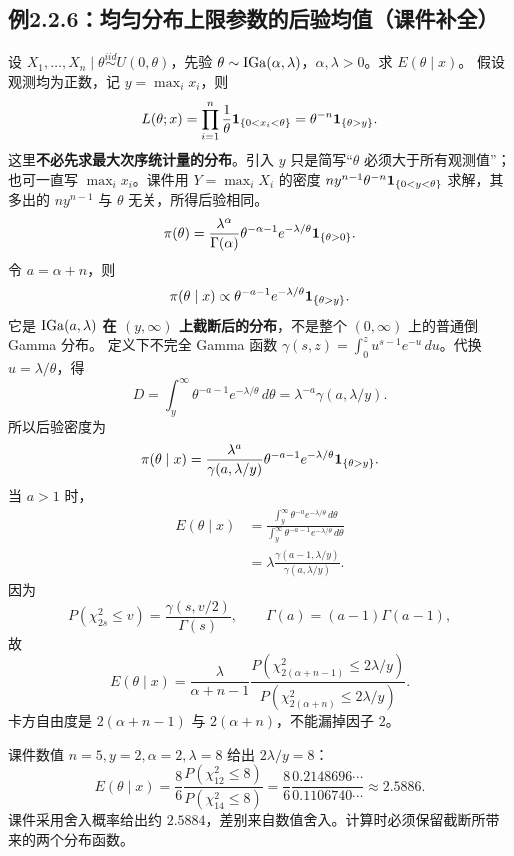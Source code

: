 \subsection{例2.2.6：均匀分布上限参数的后验均值（课件补全）}
设 $X_1,\ldots,X_n\mid\theta\overset{iid}{\sim}U(0,\theta)$，先验 $\theta\sim\operatorname{IGa}(\alpha,\lambda)$，$\alpha,\lambda>0$。求 $E(\theta\mid x)$。
假设观测均为正数，记 $y=\max_i x_i$，则
\[
L(\theta;x)=\prod_{i=1}^n\frac1\theta\mathbf{1}_{\{0<x_i<\theta\}}
=\theta^{-n}\mathbf{1}_{\{\theta>y\}}.
\]
这里\textbf{不必先求最大次序统计量的分布}。引入 $y$ 只是简写“$\theta$ 必须大于所有观测值”；也可一直写 $\max_i x_i$。课件用 $Y=\max_iX_i$ 的密度 $ny^{n-1}\theta^{-n}\mathbf{1}_{\{0<y<\theta\}}$ 求解，其多出的 $ny^{n-1}$ 与 $\theta$ 无关，所得后验相同。
\[
\pi(\theta)=\frac{\lambda^\alpha}{\Gamma(\alpha)}
\theta^{-\alpha-1}e^{-\lambda/\theta}\mathbf{1}_{\{\theta>0\}}.
\]
令 $a=\alpha+n$，则
\[
\pi(\theta\mid x)\propto\theta^{-a-1}e^{-\lambda/\theta}\mathbf{1}_{\{\theta>y\}}.
\]
它是 $\operatorname{IGa}(a,\lambda)$ \textbf{在 $(y,\infty)$ 上截断后的分布}，不是整个 $(0,\infty)$ 上的普通倒 Gamma 分布。
定义下不完全 Gamma 函数 $\gamma(s,z)=\int_0^z u^{s-1}e^{-u}\,du$。代换 $u=\lambda/\theta$，得
\[
D=\int_y^\infty\theta^{-a-1}e^{-\lambda/\theta}\,d\theta
=\lambda^{-a}\gamma(a,\lambda/y).
\]
所以后验密度为
\[
\pi(\theta\mid x)=\frac{\lambda^a}{\gamma(a,\lambda/y)}
\theta^{-a-1}e^{-\lambda/\theta}\mathbf{1}_{\{\theta>y\}}.
\]
当 $a>1$ 时，
\begin{align*}
E(\theta\mid x)
&=\frac{\displaystyle\int_y^\infty\theta^{-a}e^{-\lambda/\theta}\,d\theta}
{\displaystyle\int_y^\infty\theta^{-a-1}e^{-\lambda/\theta}\,d\theta}\\
&=\lambda\frac{\gamma(a-1,\lambda/y)}{\gamma(a,\lambda/y)}.
\end{align*}
因为
\[
P(\chi^2_{2s}\leq v)=\frac{\gamma(s,v/2)}{\Gamma(s)},\qquad
\Gamma(a)=(a-1)\Gamma(a-1),
\]
故
\[
\boxed{E(\theta\mid x)=\frac{\lambda}{\alpha+n-1}
\frac{P(\chi^2_{2(\alpha+n-1)}\leq2\lambda/y)}
{P(\chi^2_{2(\alpha+n)}\leq2\lambda/y)}.}
\]
卡方自由度是 $2(\alpha+n-1)$ 与 $2(\alpha+n)$，不能漏掉因子 $2$。

课件数值 $n=5,y=2,\alpha=2,\lambda=8$ 给出 $2\lambda/y=8$：
\[
E(\theta\mid x)=\frac86\frac{P(\chi^2_{12}\leq8)}{P(\chi^2_{14}\leq8)}
=\frac86\frac{0.2148696\cdots}{0.1106740\cdots}\approx2.5886.
\]
课件采用舍入概率给出约 $2.5884$，差别来自数值舍入。计算时必须保留截断所带来的两个分布函数。

